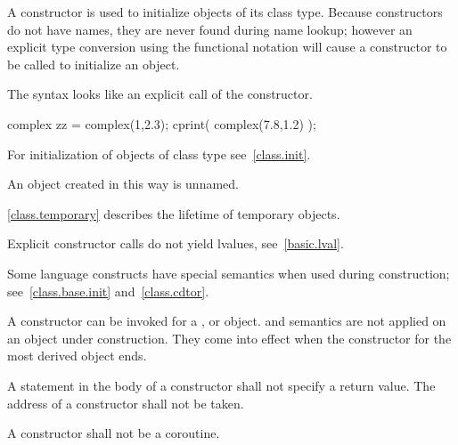 \pnum
{}%
A constructor is used to initialize objects of its class type.
Because constructors do not have names, they are never found during
name lookup; however an explicit type conversion using the functional
notation will cause a constructor to be called to
initialize an object.
\begin{note}
The syntax looks like an explicit call of the constructor.
\end{note}
\begin{example}
\begin{codeblock}
complex zz = complex(1,2.3);
cprint( complex(7.8,1.2) );
\end{codeblock}
\end{example}
\begin{note}
For initialization of objects of class type see~\ref{class.init}.
\end{note}

\pnum
{}%
An object created in this way is unnamed.
\begin{note}
\ref{class.temporary} describes the lifetime of temporary objects.
\end{note}
\begin{note}
Explicit constructor calls do not yield lvalues, see~\ref{basic.lval}.
\end{note}

\pnum
\begin{note}
%
Some language constructs have special semantics when used during construction;
see~\ref{class.base.init} and~\ref{class.cdtor}.
\end{note}

\pnum
{}%
%
A constructor can be invoked for a
,
or
object.
%
and
semantics are not applied on an object under construction.
They come into effect when the constructor for the
most derived object ends.

\pnum
{}%
A
statement in the body of a constructor shall not specify a return value.
%
The address of a constructor shall not be taken.

\pnum
A constructor shall not be a coroutine.


